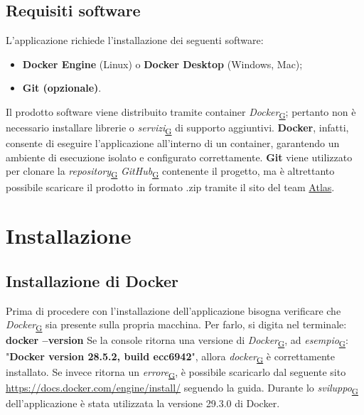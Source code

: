 \documentclass[a4paper,12pt]{article}
\begin{document}
    \subsection{Requisiti software}
        L'applicazione richiede l'installazione dei seguenti software:
        \begin{itemize}
            \item \textbf{Docker Engine} (Linux) o \textbf{Docker Desktop} (Windows, Mac);
            \item \textbf{Git (opzionale)}.
        \end{itemize}

        Il prodotto software viene distribuito tramite container \textit{Docker}\textsubscript{\href{https://atlasteam9.github.io/Atlas/glossario.html\#Docker}{G}}; pertanto non è necessario installare librerie o \textit{servizi}\textsubscript{\href{https://atlasteam9.github.io/Atlas/glossario.html\#Servizi}{G}} di supporto aggiuntivi. \newline
        \textbf{Docker}, infatti, consente di eseguire l'applicazione all'interno di un container, garantendo un ambiente di esecuzione isolato e configurato correttamente.
        \textbf{Git} viene utilizzato per clonare la \textit{repository}\textsubscript{\href{https://atlasteam9.github.io/Atlas/glossario.html\#Repository}{G}} \textit{GitHub}\textsubscript{\href{https://atlasteam9.github.io/Atlas/glossario.html\#GitHub}{G}} contenente il progetto, ma è altrettanto possibile scaricare il prodotto in formato .zip tramite il sito del team \href{https://atlasteam9.github.io/Atlas/}{Atlas}.
\newpage

\section{Installazione}
    \subsection{Installazione di Docker}    
        Prima di procedere con l'installazione dell'applicazione bisogna verificare che \textit{Docker}\textsubscript{\href{https://atlasteam9.github.io/Atlas/glossario.html\#Docker}{G}} sia presente sulla propria macchina. Per farlo, si digita nel terminale: \newline 
        \textbf{docker --version}\newline
        Se la console ritorna una versione di \textit{Docker}\textsubscript{\href{https://atlasteam9.github.io/Atlas/glossario.html\#Docker}{G}}, ad \textit{esempio}\textsubscript{\href{https://atlasteam9.github.io/Atlas/glossario.html\#Esempio}{G}}: "\textbf{Docker version 28.5.2, build ecc6942}",
        allora \textit{docker}\textsubscript{\href{https://atlasteam9.github.io/Atlas/glossario.html\#Docker}{G}} è correttamente installato. Se invece ritorna un \textit{errore}\textsubscript{\href{https://atlasteam9.github.io/Atlas/glossario.html\#Errore}{G}}, è possibile scaricarlo dal seguente sito \url{https://docs.docker.com/engine/install/} seguendo la guida. Durante lo \textit{sviluppo}\textsubscript{\href{https://atlasteam9.github.io/Atlas/glossario.html\#Sviluppo}{G}} dell'applicazione è stata utilizzata la versione 29.3.0 di Docker.
\end{document}
